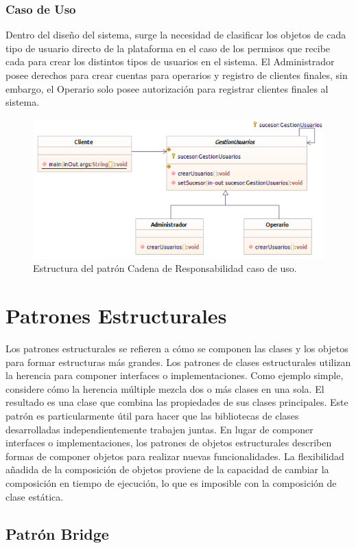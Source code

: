 \subsubsection{Caso de Uso}
Dentro del diseño del sistema, surge la necesidad de clasificar los objetos de cada tipo de usuario directo de la plataforma en el caso de los permisos que recibe cada para crear los distintos tipos de usuarios en el sistema. El Administrador posee derechos para crear cuentas para operarios y registro de clientes finales, sin embargo, el Operario solo posee autorización para registrar clientes finales al sistema.

\begin{figure}[th!]
	\centering
	\includegraphics[width=.7\linewidth]{imagenes/Patrones/Cadena_caso.pdf}
	\caption{Estructura del patrón Cadena de Responsabilidad caso de uso.\cite{gof}}	
\end{figure}

\section{Patrones Estructurales}
Los patrones estructurales se refieren a cómo se componen las clases y los objetos para formar estructuras más grandes. Los patrones de clases estructurales utilizan la herencia para componer interfaces o implementaciones. Como ejemplo simple, considere cómo la herencia múltiple mezcla dos o más clases en una sola. El resultado es una clase que combina las propiedades de sus clases principales. Este patrón es particularmente útil para hacer que las bibliotecas de clases desarrolladas independientemente trabajen juntas. En lugar de componer interfaces o implementaciones, los patrones de objetos estructurales describen formas de componer objetos para realizar nuevas funcionalidades. La flexibilidad añadida de la composición de objetos proviene de la capacidad de cambiar la composición en tiempo de ejecución, lo que es imposible con la composición de clase estática.\cite{gof}
\subsection{Patrón Bridge}



